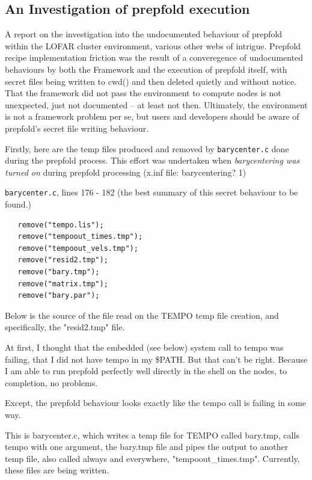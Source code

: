 \documentclass[a4paper,10pt,bibtotoc]{scrartcl}
\begin{document}
\subsection{An Investigation of prepfold execution}
A report on the investigation into the undocumented behaviour of
prepfold within the LOFAR cluster environment, various other webs
of intrigue.  Prepfold recipe implementation friction was the result
of a converegence of undocumented behaviours by both the Framework
and the execution of prepfold itself, with secret files being written 
to cwd() and then deleted quietly and without notice.  That the framework
did not pass the environment to compute nodes is not unexpected, just not
documented -- at least not then.  Ultimately, the environment is not 
a framework problem per se, but users and developers should be aware of
prepfold's secret file writing behaviour.

Firstly, here are the temp files produced and removed by 
\texttt{barycenter.c} done during the prepfold process.  This effort
was undertaken when \textit{barycentering was turned on} during 
prepfold processing (x.inf file: barycentering?  1)

\texttt{barycenter.c}, lines 176 - 182 (the best summary of this 
secret behaviour to be found.)

\begin{verbatim}   remove("tempo.lis");
   remove("tempoout_times.tmp");
   remove("tempoout_vels.tmp");
   remove("resid2.tmp");
   remove("bary.tmp");
   remove("matrix.tmp");
   remove("bary.par");
\end{verbatim}

Below is the source of the file read on the TEMPO temp file creation,
and specifically, the "resid2.tmp" file.

At first, I thought that the embedded (see below) system call to tempo 
was failing, that I did not have tempo in my \$PATH.  But that can't be
right. Because I am able to run prepfold perfectly well directly in the
shell on the nodes, to completion, no problems.

Except, the prepfold behaviour looks exactly like the tempo call is
failing in some way.

This is barycenter.c, which writes a temp file for TEMPO called bary.tmp,
calls tempo with one argument, the bary.tmp file and pipes the output to
another temp file, also called always and everywhere, "tempoout\_times.tmp".
Currently, these files are being written.
\end{document}
